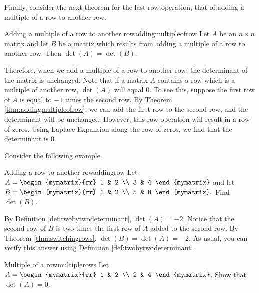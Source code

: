 Finally, consider the next theorem for the last row operation, that of adding a multiple of a row
to another row. 

\begin{theorem}{Adding a multiple of a row to another row}{addingmultipleofrow}
Let $A$ be an $n\times n$ matrix and let $B$ be a matrix
which results from adding a multiple of a row to another row.
 Then $\det \left( A\right) =\det
\left( B \right) $.
\end{theorem}

Therefore, when we add a multiple of a row to another row, the determinant of the matrix is unchanged. 
Note that if a matrix $A$ contains a row which is a multiple of another row, $\det \left(A\right)$ will equal $0$. To see this,
suppose the first row of $A$ is equal to $-1$ times the second row. By Theorem \ref{thm:addingmultipleofrow}, we can 
add the first row to the second row, and the determinant will be unchanged. However, this row operation will result in a row of zeros.
Using Laplace Expansion along the row of zeros, we find that the determinant is $0$. 

Consider the following example.

\begin{example}{Adding a row to another row}{addingrow}
Let $A=\begin{mymatrix}{rr}
1 & 2 \\
3 & 4
\end{mymatrix} $ and let $B=\begin{mymatrix}{rr}
1 & 2 \\
5 & 8
\end{mymatrix} .$ 
Find $\det \left(B\right)$.
\end{example}

\begin{solution}
By Definition \ref{def:twobytwodeterminant}, $\det \left(A\right) = -2$. 
Notice that the second row of $B$ is two times the first row of $A$ added
to the second row. 
By Theorem \ref{thm:switchingrows}, $\det \left( B\right) = \det \left( A \right)
=-2$.
As usual, you can verify this answer using Definition \ref{def:twobytwodeterminant}.
\end{solution}

\begin{example}{Multiple of a row}{multiplerows}
Let $A = \begin{mymatrix}{rr}
1 & 2 \\
2 & 4 
\end{mymatrix}$. Show that $\det \left( A \right) = 0$. 
\end{example}

